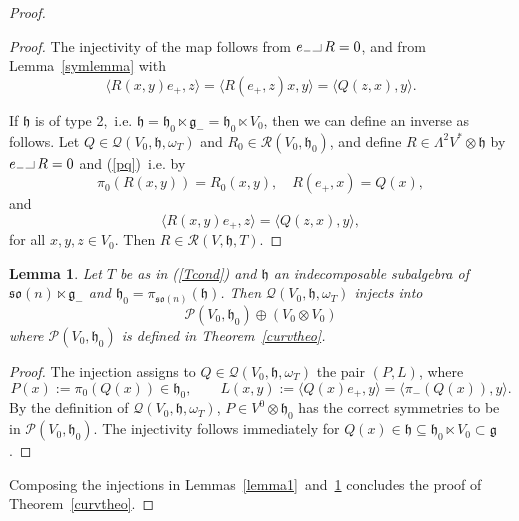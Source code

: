 \documentclass[11pt,a4paper]{amsart}
\DeclareMathOperator{\Wedge}{{\mathlarger{\mathlarger{\mathlarger{\wedge}}}}}
\def\red{\color[rgb]{1,0,0}}
\newcommand{\g}{\mathfrak{g}}
\newcommand{\h}{\mathfrak{h}}
\newcommand{\+}{\oplus}
\newcommand{\so}{\mathfrak{so}}
\newcommand{\hook}{\makebox[7pt]{\rule{6pt}{.3pt}\rule{.3pt}{5pt}}\,}
\newcommand{\1}{\mathbf{1}}
\newcommand{\<}{\langle}
\renewcommand{\>}{\rangle}
\theoremstyle{definition}
\theoremstyle{plain}
\newtheorem{lemma}[definition]{Lemma}
\numberwithin{equation}{section}
\begin{document}
\begin{proof}
\begin{proof}
The injectivity of the map follows from $e_-\hook R=0$, and from Lemma~\ref{symlemma} with
\[\<R(x,y)e_+,z\>=\<R(e_+,z)x,y\>=\<Q(z,x),y\>.\]


If $\h$ is of type 2,~i.e. $\h= \h_0\ltimes \g_-=\h_0\ltimes V_0$, then we can define an inverse as follows.
Let $Q\in\mathcal Q (V_0,\h,\omega_T)  $ and $R_0\in \mathcal R(V_0,\h_0)$, and define $R\in \Lambda^2V^* \otimes \h $ by $e_-\hook R=0$ and (\ref{pq})~i.e. 
by \[\pi_0(R(x,y))=R_0(x,y),\quad R(e_+,x)=Q(x),\]
and 
\[ \<R(x,y)e_+,z\>= \<Q(z,x),y\>,\]
for all $x,y,z\in V_0$.
Then  $R\in  \mathcal R (V,\h,T)$.
\end{proof}

%
%

\begin{lemma}\label{lemma2}
Let $T$ be as in (\ref{Tcond}) and $\h$ an indecomposable subalgebra of $\so(n)\ltimes \g_-$ and $\h_0=\pi_{\so(n)}(\h)$. 
 Then 
$\mathcal Q(V_0,\h,\omega_T)$ injects into 
\[\mathcal P(V_0,\h_0) \+ 
 (V_0\otimes V_0)\]
where
$\mathcal P(V_0,\h_0)$ is defined in Theorem~\ref{curvtheo}. 
\end{lemma}
\begin{proof}
The injection assigns to $Q\in \mathcal Q(V_0,\h,\omega_T)$ the pair
$(P , L )$, where 
\[P(x):=\pi_0( Q(x))\in \h_0,\qquad L(x,y):=\< Q(x)e_+,y\>=\<\pi_-(Q(x)),y\>.\] 
By the definition of $\mathcal Q(V_0,\h,\omega_T)$, $P\in V^0\otimes \h_0$ has the correct symmetries to be  in $\mathcal P(V_0,\h_0)$. 
The injectivity follows immediately for $Q(x)\in \h\subseteq\h_0\ltimes V_0\subset \g$. 
\end{proof}
Composing the injections in Lemmas~\ref{lemma1}~and~\ref{lemma2} concludes the proof of Theorem~\ref{curvtheo}.
\end{proof}
\end{document}
